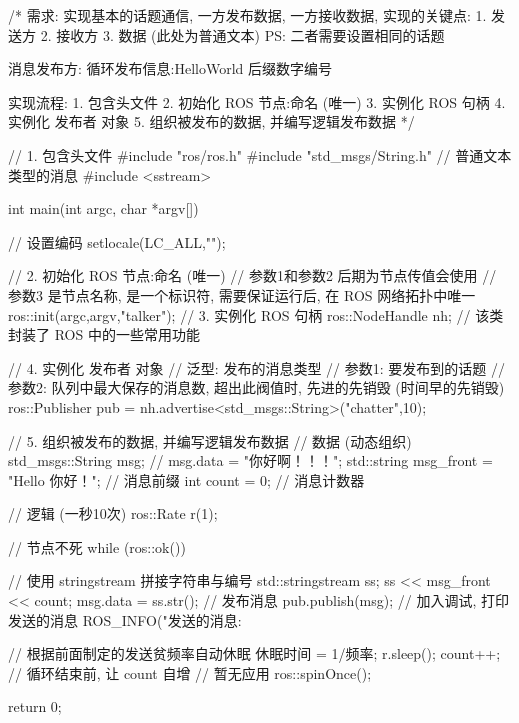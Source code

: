 \documentclass[openany, fontset=windowsold]{ctexbook}
\theoremstyle{kaiti}
\theoremstyle{normal}
\begin{document}
\begin{cpp}
  /*
      需求: 实现基本的话题通信, 一方发布数据, 一方接收数据, 
          实现的关键点:
          1. 发送方
          2. 接收方
          3. 数据 (此处为普通文本)
          PS: 二者需要设置相同的话题

      消息发布方:
          循环发布信息:HelloWorld 后缀数字编号

      实现流程:
          1. 包含头文件 
          2. 初始化 ROS 节点:命名 (唯一)
          3. 实例化 ROS 句柄
          4. 实例化 发布者 对象
          5. 组织被发布的数据, 并编写逻辑发布数据
  */

  // 1. 包含头文件 
  #include "ros/ros.h"
  #include "std_msgs/String.h" // 普通文本类型的消息
  #include <sstream>

  int main(int argc, char  *argv[])
  {   
      // 设置编码
      setlocale(LC_ALL,"");

      // 2. 初始化 ROS 节点:命名 (唯一)
      // 参数1和参数2 后期为节点传值会使用
      // 参数3 是节点名称, 是一个标识符, 需要保证运行后, 在 ROS 网络拓扑中唯一
      ros::init(argc,argv,"talker");
      // 3. 实例化 ROS 句柄
      ros::NodeHandle nh; // 该类封装了 ROS 中的一些常用功能

      // 4. 实例化 发布者 对象
      // 泛型: 发布的消息类型
      // 参数1: 要发布到的话题
      // 参数2: 队列中最大保存的消息数, 超出此阀值时, 先进的先销毁 (时间早的先销毁)
      ros::Publisher pub = nh.advertise<std_msgs::String>("chatter",10);

      // 5. 组织被发布的数据, 并编写逻辑发布数据
      // 数据 (动态组织)
      std_msgs::String msg;
      // msg.data = "你好啊！！！";
      std::string msg_front = "Hello 你好！"; // 消息前缀
      int count = 0; // 消息计数器

      // 逻辑 (一秒10次)
      ros::Rate r(1);

      // 节点不死
      while (ros::ok())
      {
          // 使用 stringstream 拼接字符串与编号
          std::stringstream ss;
          ss << msg_front << count;
          msg.data = ss.str();
          // 发布消息
          pub.publish(msg);
          // 加入调试, 打印发送的消息
          ROS_INFO("发送的消息:%

          // 根据前面制定的发送贫频率自动休眠 休眠时间 = 1/频率; 
          r.sleep();
          count++; // 循环结束前, 让 count 自增
          // 暂无应用
          ros::spinOnce();
      }


      return 0;
  }
\end{cpp}
\end{document}
